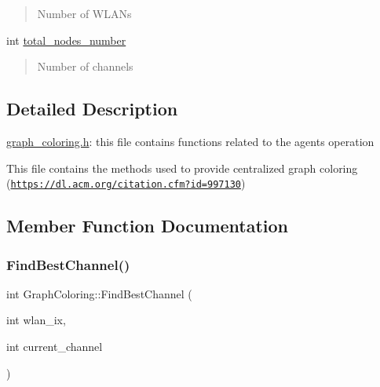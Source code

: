 \begin{DoxyCompactItemize}
\begin{DoxyCompactList}
\begin{quote}
Number of W\+L\+A\+Ns \end{quote}
\end{DoxyCompactList}\item 
\mbox{\label{classGraphColoring_a4f0dc20fe58533aacf89d1aebc469884}} 
int \hyperlink{classGraphColoring_a4f0dc20fe58533aacf89d1aebc469884}{total\+\_\+nodes\+\_\+number}
\begin{DoxyCompactList}\small\item\em \begin{quote}
Number of channels \end{quote}
\end{DoxyCompactList}\end{DoxyCompactItemize}


\subsection{Detailed Description}
\hyperlink{graph__coloring_8h_source}{graph\+\_\+coloring.\+h}\+: this file contains functions related to the agents\textquotesingle{} operation


\begin{DoxyItemize}
\item This file contains the methods used to provide centralized graph coloring (\href{https://dl.acm.org/citation.cfm?id=997130}{\tt https\+://dl.\+acm.\+org/citation.\+cfm?id=997130}) 
\end{DoxyItemize}

\subsection{Member Function Documentation}
\mbox{\label{classGraphColoring_ab15cb08c098dbc3edb271b38de730b9f}} 
\subsubsection{\texorpdfstring{Find\+Best\+Channel()}{FindBestChannel()}}
{\footnotesize\ttfamily int Graph\+Coloring\+::\+Find\+Best\+Channel (\begin{DoxyParamCaption}\item[{int}]{wlan\+\_\+ix,  }\item[{int}]{current\+\_\+channel }\end{DoxyParamCaption})\hspace{0.3cm}{\ttfamily [inline]}}

